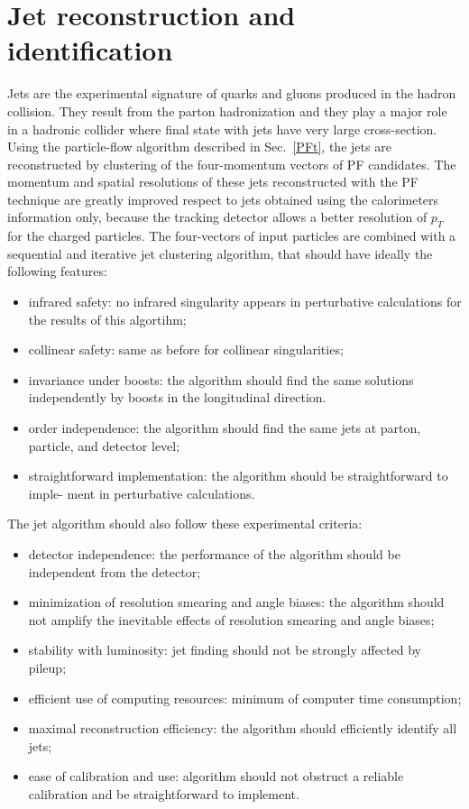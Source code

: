 \section{Jet reconstruction and identification}
\label{jetr}
Jets are the experimental signature of quarks and gluons produced in the hadron collision. They result from the parton  hadronization and they play a major role in a hadronic collider where final state with jets have very large cross-section. %
Using the particle-flow algorithm described in Sec.~\ref{PFt}, the  jets are reconstructed by clustering of the  four-momentum vectors of PF candidates.%
The momentum and spatial resolutions of these jets reconstructed with the PF technique are greatly improved respect to jets obtained using the calorimeters information only, because the tracking detector allows a better resolution of $p_T$ for the charged particles.
The four-vectors of input particles are combined with a sequential and iterative jet clustering algorithm, that should have ideally the following features:
\begin{itemize}
\item infrared safety: no infrared singularity appears in perturbative calculations for the results of this algortihm;
\item collinear safety: same as before for collinear singularities;
\item invariance under boosts: the algorithm should find the same solutions independently
by boosts in the longitudinal direction.
\item order independence: the algorithm should find the same jets at parton, particle, and detector level;
\item straightforward implementation: the algorithm should be straightforward to imple-
ment in perturbative calculations.
\end{itemize}
The jet algorithm should also follow these  experimental criteria:
\begin{itemize}
\item detector independence: the performance of the algorithm should be independent from the detector;
\item minimization of resolution smearing and angle biases: the algorithm should not
amplify the inevitable effects of resolution smearing and angle biases;
\item stability with luminosity: jet finding should not be strongly affected by pileup;
\item efficient use of computing resources: minimum of computer time consumption;
\item maximal reconstruction efficiency: the algorithm should efficiently identify all jets;
\item ease of calibration and use: algorithm should not obstruct a reliable calibration and be straightforward to implement.
\end{itemize}
